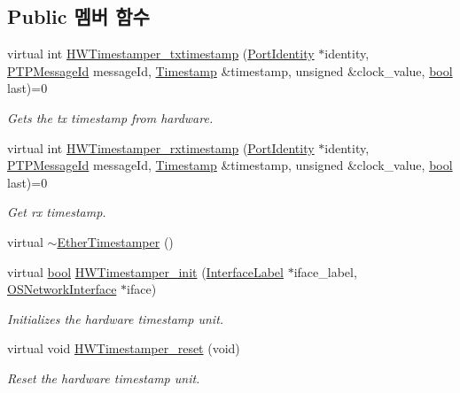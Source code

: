 \subsection*{Public 멤버 함수}
\begin{DoxyCompactItemize}
\item 
virtual int \hyperlink{class_ether_timestamper_a82619058d136ce4314189f1c9db91914}{H\+W\+Timestamper\+\_\+txtimestamp} (\hyperlink{class_port_identity}{Port\+Identity} $\ast$identity, \hyperlink{class_p_t_p_message_id}{P\+T\+P\+Message\+Id} message\+Id, \hyperlink{class_timestamp}{Timestamp} \&timestamp, unsigned \&clock\+\_\+value, \hyperlink{avb__gptp_8h_af6a258d8f3ee5206d682d799316314b1}{bool} last)=0
\begin{DoxyCompactList}\small\item\em Gets the tx timestamp from hardware. \end{DoxyCompactList}\item 
virtual int \hyperlink{class_ether_timestamper_afcc61feb25861ff20edbb657170a3c9e}{H\+W\+Timestamper\+\_\+rxtimestamp} (\hyperlink{class_port_identity}{Port\+Identity} $\ast$identity, \hyperlink{class_p_t_p_message_id}{P\+T\+P\+Message\+Id} message\+Id, \hyperlink{class_timestamp}{Timestamp} \&timestamp, unsigned \&clock\+\_\+value, \hyperlink{avb__gptp_8h_af6a258d8f3ee5206d682d799316314b1}{bool} last)=0
\begin{DoxyCompactList}\small\item\em Get rx timestamp. \end{DoxyCompactList}\item 
virtual \hyperlink{class_ether_timestamper_ab42cf6785a1935d28e014f31ea34ac35}{$\sim$\+Ether\+Timestamper} ()
\item 
virtual \hyperlink{avb__gptp_8h_af6a258d8f3ee5206d682d799316314b1}{bool} \hyperlink{class_common_timestamper_abde0de8253fd960807f7f2816c0c5225}{H\+W\+Timestamper\+\_\+init} (\hyperlink{class_interface_label}{Interface\+Label} $\ast$iface\+\_\+label, \hyperlink{class_o_s_network_interface}{O\+S\+Network\+Interface} $\ast$iface)
\begin{DoxyCompactList}\small\item\em Initializes the hardware timestamp unit. \end{DoxyCompactList}\item 
virtual void \hyperlink{class_common_timestamper_a1ee6bfcaf63bef07bbed1306e52e7203}{H\+W\+Timestamper\+\_\+reset} (void)
\begin{DoxyCompactList}\small\item\em Reset the hardware timestamp unit. \end{DoxyCompactList}\item 

\end{DoxyCompactItemize}
